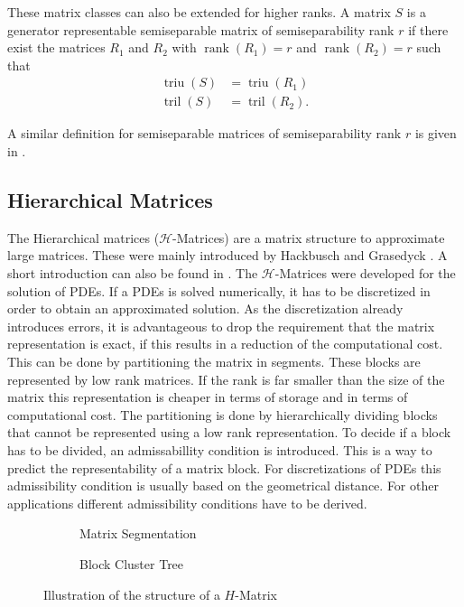 \documentclass[numbers=noenddot,doctype=mastersthesis,BCOR=15mm,biblatex]{ldvbook}%
\DeclareMathOperator{\rank}{rank}
\DeclareMathOperator{\triu}{triu}
\DeclareMathOperator{\tril}{tril}
\begin{document}
These matrix classes can also be extended for higher ranks.
A matrix $S$ is a generator representable semiseparable matrix of semiseparability rank $r$ if there exist the matrices $R_1$ and $R_2$ with $\rank(R_1)=r$ and $\rank(R_2)=r$ such that
\begin{align}
\triu(S) &= \triu(R_1)\\
\tril(S) &= \tril(R_2)
.
\end{align}

A similar definition for semiseparable matrices of semiseparability rank $r$ is given in \cite{vandebril_bibliography_2005}.

\subsection{Hierarchical Matrices}\label{subsec:H-mat}
The Hierarchical matrices ($\mathcal{H}$-Matrices) are a matrix structure to approximate large matrices. These were mainly introduced by Hackbusch \cite{hackbusch_hierarchische_2009} and Grasedyck \cite{grasedyck_theorie_2001}.
A short introduction can also be found in \cite{grasedyck_adaptive_2004}.
The $\mathcal{H}$-Matrices were developed for the solution of PDEs.
If a PDEs is solved numerically, it has to be discretized in order to obtain an approximated solution.
As the discretization already introduces errors, it is advantageous to drop the requirement that the matrix representation is exact, if this results in a reduction of the computational cost.
This can be done by partitioning the matrix in segments. These blocks are represented by low rank matrices. If the rank is far smaller than the size of the matrix this representation is cheaper in terms of storage and in terms of computational cost.
The partitioning is done by hierarchically dividing blocks that cannot be represented using a low rank representation.
To decide if a block has to be divided, an admissabillity condition is introduced.
This is a way to predict the representability of a matrix block.
For discretizations of PDEs this admissibility condition is usually based on the geometrical distance.
For other applications different admissibility conditions have to be derived.

\begin{figure}
	\centering
	\begin{subfigure}[b]{0.45\textwidth}
		\centering
		
		\caption{Matrix Segmentation}
		\label{fig:strukturh-matrix_a}
	\end{subfigure}
	\begin{subfigure}[b]{0.45\textwidth}
	\centering
	\resizebox{0.7\textwidth}{!}{
	
	}
	\caption{Block Cluster Tree}
	\label{fig:strukturh-matrix_b}
	\end{subfigure}
	\caption{Illustration of the structure of a $H$-Matrix}
	\label{fig:strukturh-matrix}
\end{figure}
\end{document}
